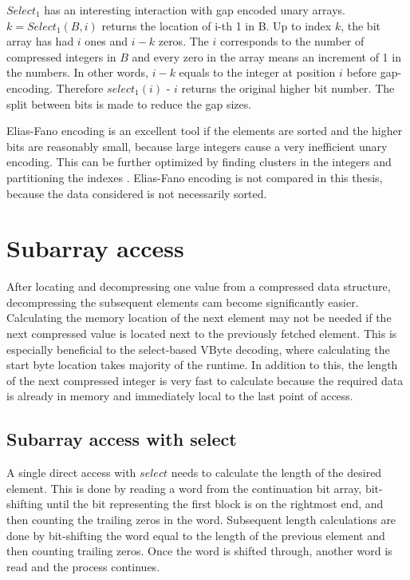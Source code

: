 $Select_1$ has an interesting interaction with gap encoded unary arrays. $k = Select_1(B,i)$ 
returns the location of i-th 1 in B. Up to index $k$, the bit array has had $i$ ones and $i-k$ zeros. The $i$ corresponds to the number of compressed integers in $B$ and every zero in the array 
means an increment of 1 in the numbers. In other words, $i-k$ equals to the integer at position $i$ before gap-encoding. Therefore $select_1(i)$ - $i$ returns the original higher bit number. The split 
between bits is made to reduce the gap sizes.

Elias-Fano encoding is an excellent tool if the elements are sorted and the higher bits are reasonably small, because large integers cause a very inefficient unary encoding. This can be further optimized 
by finding clusters in the integers and partitioning the indexes \citep{Ott14}. Elias-Fano encoding is not compared in this thesis, because the data considered is not necessarily sorted.


\chapter{Subarray access}

After locating and decompressing one value from a compressed data structure, decompressing the subsequent elements cam become significantly easier. Calculating the memory location of the next element may not 
be needed if the next compressed value is located next to the previously fetched element. This is especially beneficial to the select-based VByte decoding, where calculating the start 
byte location takes majority of the runtime. In addition to this, the length of the next compressed integer is very fast to calculate because the required data is already in memory and immediately local to the last point of access.

\section{Subarray access with select}
A single direct access with $select$ needs to calculate the length of the desired element. This is done by reading a word from the continuation bit array, bit-shifting until the bit representing 
the first block is on the rightmost end, and then counting the trailing zeros in the word. Subsequent length calculations are done by bit-shifting the word equal to the length of the previous element 
and then counting trailing zeros. Once the word is shifted through, another word is read and the process continues.

